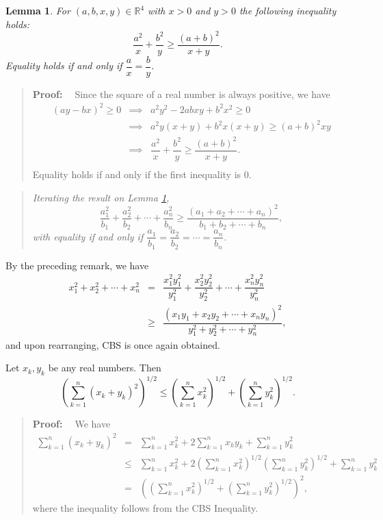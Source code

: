 \documentclass[11pt, openany]{book}
\theoremstyle{change} \theoremheaderfont{\blue\sffamily\bfseries}
\newtheorem{lem}[thm]{Lemma}
\newcommand{\proofsymbol}{\Pisymbol{pzd}{113}}
\theoremstyle{nonumberplain} \theoremheaderfont{\sffamily\bfseries}
\newenvironment{pf}[0]{\itshape\begin{quote}{\bf Proof: \ }}{\proofsymbol\end{quote}}
\newenvironment{t-pf}[0]{\itshape\begin{quote}{\bf Third Proof: \ }}{\proofsymbol\end{quote}}
\newenvironment{rem}[0]{\begin{quote}{\huge\textcolor{red}{\Pisymbol{pzd}{43}}}\itshape }{\end{quote}}
\newcommand{\BBR}{\mathbb{R}}
\newcommand{\í}{\'{\i}}
\begin{document}
\begin{lem}\label{lem:for-CBS}
For $(a,b,x,y)\in \BBR^4$ with $x>0$ and $y>0$ the following
inequality holds: $$\dfrac{a^2}{x}+\dfrac{b^2}{y}\geq
\dfrac{(a+b)^2}{x+y}.
$$Equality holds if and only if $\dfrac{a}{x} = \dfrac{b}{y}$.
\end{lem}
\begin{pf}
Since the square of a real number is always positive, we have
$$\begin{array}{lll}(ay-bx)^2\geq 0& \implies & a^2y^2-2abxy+b^2x^2\geq 0\\ & \implies & a^2y(x+y)+b^2x(x+y) \geq
(a+b)^2xy\\
& \implies & \dfrac{a^2}{x}+\dfrac{b^2}{y}\geq
\dfrac{(a+b)^2}{x+y}.\\
\end{array}$$ Equality holds if and only if the first inequality is $0$.\end{pf}
\begin{rem}
Iterating the result on Lemma \ref{lem:for-CBS},
$$\dfrac{a_1 ^2}{b_1} + \dfrac{a_2 ^2}{b_2} + \cdots + \dfrac{a_n ^2}{b_n} \geq \dfrac{(a_1+a_2+\cdots + a_n)^2}{b_1+b_2+\cdots + b_n}, $$
with equality if and only if
$\dfrac{a_1}{b_1}=\dfrac{a_2}{b_2}=\cdots = \dfrac{a_n}{b_n}.$
\end{rem}
\begin{t-pf}
By the preceding remark, we have
$$\begin{array}{lll}x_1 ^2 + x_2 ^2 + \cdots + x_n ^2 & = & \dfrac{x_1 ^2 y_1 ^2}{y_1 ^2}+ \dfrac{x_2 ^2 y_2 ^2}{y_2 ^2}+\cdots +  \dfrac{x_n ^2 y_n ^2}{y_n ^2}
\\ & \geq & \dfrac{(x_1y_1+x_2y_2+\cdots + x_ny_n)^2}{y_1 ^2+y_2 ^2 +
\cdots + y_n ^2},
\end{array}
$$and upon rearranging, CBS is once again obtained.\end{t-pf}
\begin{thm}\label{thm:minkowski-ineq}
Let $x_k, y_k$ be any real numbers. Then
$$ \left(\sum _{k=1} ^n (x_k+y_k)^2\right)^{1/2}\leq  \left(\sum _{k=1} ^n x_k ^2\right)^{1/2} +  \left(\sum _{k=1} ^n y_k ^2\right)^{1/2}. $$
\end{thm}
\begin{pf}
We have
$$ \begin{array}{lll}\sum _{k=1} ^n (x_k+y_k)^2 & = & \sum _{k=1} ^n x_k ^2+2\sum _{k=1} ^n x_ky_k      +\sum _{k=1} ^ny_k ^2\\
& \leq & \sum _{k=1} ^n x_k ^2+2\left(\sum _{k=1} ^n x_k
^2\right)^{1/2}\left(\sum _{k=1} ^ny_k ^2\right)^{1/2} +\sum _{k=1} ^ny_k ^2\\
& = & \left(\left(\sum _{k=1} ^nx_k ^2\right)^{1/2} +\left(\sum
_{k=1} ^ny_k ^2\right)^{1/2} \right)^2,\end{array}$$where the
inequality follows from the CBS Inequality.\end{pf}
\end{document}

